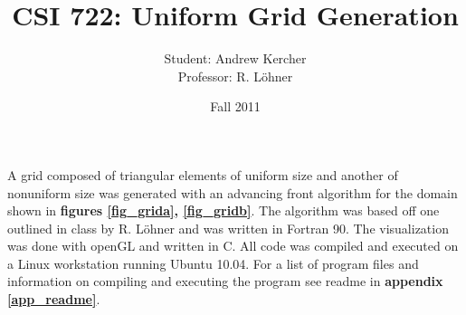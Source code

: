 \documentclass[11pt]{article}
\title{CSI 722: Uniform Grid Generation}
\author{Student: Andrew Kercher \\ Professor: R. L\"{o}hner}
\date{Fall 2011}
\begin{document}
\maketitle

\newcommand{\be}[1]{\begin{#1}}
\newcommand{\eb}[1]{\end{#1}}
\newcommand{\beenum}[0]{\begin{enumerate}}
\newcommand{\ebenum}[0]{\end{enumerate}}
\newcommand{\bei}[0]{\begin{itemize}}
\newcommand{\ebi}[0]{\end{itemize}}
\newcommand{\ds}[0]{\displaystyle}
\newcommand{\tbf}[1]{\textbf{#1}}
\newcommand{\vecnote}[1]{\ensuremath{\mathbf{#1}}}
\newcommand{\scinote}[2]{\ensuremath{#1 \times 10^{#2}}}
\newcommand{\mbf}[1]{\ensuremath{\mathbf{#1}}}
\newcommand{\dotproduct}[2]{\ensuremath{\mathbf{#1} \cdot \mathbf{#2}}}
\newcommand{\crossproduct}[2]{\ensuremath{\mathbf{#1} \times \mathbf{#2}}}
\newcommand{\grad}[1]{\ensuremath{\mathbf{\nabla}#1}}
\newcommand{\laplace}[1]{\ensuremath{\nabla^2#1}}
\newcommand{\diverge}[1]{\ensuremath{\mathbf{\nabla} \cdot \mathbf{#1}}}
\newcommand{\curl}[1]{\ensuremath{\mathbf{\nabla} \times \mathbf{#1}}}

\newcommand{\dd}[2]{\ensuremath{\frac{d #1}{d #2}}}
\newcommand{\pd}[2]{\ensuremath{\frac{\partial #1}{\partial #2}}}

\newcommand{\ta}[1]{\ensuremath{\langle #1 \rangle}} %

\newcommand{\conk}[0]{\frac{1}{4\pi\epsilon_0}}
\newcommand{\sio}[0]{\ensuremath{\text{SiO}_2}}


A grid composed of triangular elements of uniform size and another of nonuniform size was generated with an advancing front algorithm for the domain shown in \textbf{figures \ref{fig_grida}, \ref{fig_gridb}}.  The algorithm was based off one outlined in class by R. L\"{o}hner and was written in Fortran 90.  The visualization was done with openGL and written in C.  All code was compiled and executed on a Linux workstation running Ubuntu 10.04.  For a list of program files and information on compiling and executing the program see readme in \textbf{appendix \ref{app_readme}}.  
\end{document}
